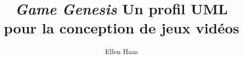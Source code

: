 \documentclass[12pt,twoside]{memoireuqam1.3}
\begin{document}
\title{\emph{Game Genesis} \hspace{20cm} Un profil UML pour la conception de jeux vidéos}
\author{Ellen Haas}
\uqammemoire %
{}
\thispagestyle{empty}        %
\maketitle



\renewcommand \bibname{BIBLIOGRAPHIE}
\renewcommand \listfigurename{LISTE DES FIGURES}
\renewcommand \appendixname{ANNEXE} %
\renewcommand \figurename{Figure}
\renewcommand \tablename{Tableau}

\addtocounter{page}{1} %
%
%
%

\tableofcontents %
\listoffigures %
\listoftables %





















\end{document}
